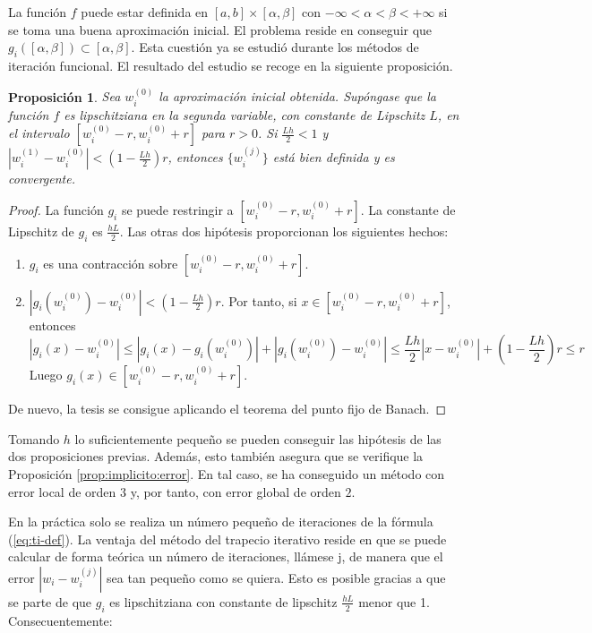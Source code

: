 \documentclass{article}
\theoremstyle{theorem-style}  %
\newtheorem{proposition}[theorem]{Proposición}
\theoremstyle{definition-style}
\theoremstyle{example-style}
\begin{document}
	La función $f$ puede estar definida en $[a,b]\times[\alpha, \beta]$ con  $-\infty < \alpha < \beta < +\infty$ si se toma una buena aproximación inicial. El problema reside en conseguir que $g_i([\alpha,\beta]) \subset [\alpha,\beta]$. Esta cuestión ya se estudió durante los métodos de iteración funcional. El resultado del estudio se recoge en la siguiente proposición.

	\begin{proposition}
		Sea $w_i^{(0)}$ la aproximación inicial obtenida. Supóngase que la función $f$  es lipschitziana en la segunda variable, con constante de Lipschitz $L$, en el intervalo  $[w_i^{(0)}-r,w_i^{(0)}+r]$ para $r>0$. Si $\frac{Lh}{2} < 1$ y $\left|w_i^{(1)} - w_i^{(0)}\right| < (1-\frac{Lh}{2})r$, entonces $\{w_i^{(j)}\}$ está bien definida y es convergente.
	\end{proposition}

	\begin{proof}
		La función $g_i$ se puede restringir a $[w_i^{(0)}-r,w_i^{(0)}+r]$. La constante de Lipschitz de $g_i$ es $\frac{hL}{2}$. Las otras dos hipótesis proporcionan los siguientes hechos:

		\begin{enumerate}
			\item $g_i$ es una contracción sobre $[w_i^{(0)}-r,w_i^{(0)}+r]$.
			\item $\left|g_i(w_i^{(0)}) - w_i^{(0)}\right| < (1-\frac{Lh}{2})r$. Por tanto, si $x \in [w_i^{(0)}-r,w_i^{(0)}+r]$, entonces
			$$ \left|g_i(x) - w_i^{(0)}\right| \le \left|g_i(x) - g_i(w_i^{(0)})\right| + \left|g_i(w_i^{(0)}) - w_i^{(0)}\right| \le \frac{Lh}{2} \left|x - w_i^{(0)}\right| + (1-\frac{Lh}{2})r \le r $$
			Luego $g_i(x) \in [w_i^{(0)}-r,w_i^{(0)}+r]$.
		\end{enumerate}


		De nuevo, la tesis se consigue aplicando el teorema del punto fijo de Banach.
	\end{proof}

	Tomando $h$ lo suficientemente pequeño se pueden conseguir las hipótesis de las dos proposiciones previas. Además, esto también asegura que se verifique la Proposición \ref{prop:implicito:error}.  En tal caso, se ha conseguido un método con error local de orden $3$ y, por tanto, con error global de orden $2$.

	En la práctica solo se realiza un número pequeño de iteraciones de la fórmula (\ref{eq:ti-def}). La ventaja del método del trapecio iterativo reside en que se puede calcular de forma teórica un número de iteraciones, llámese j, de manera que el error $\left|w_i - w_i^{(j)}\right|$ sea tan pequeño como se quiera. Esto es posible gracias a que se parte de que $g_i$ es lipschitziana con constante de lipschitz $\frac{hL}{2}$ menor que 1. Consecuentemente:
\end{document}

